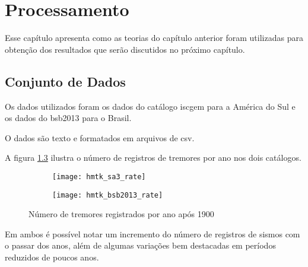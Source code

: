 \chapter{Processamento}
\label{cap:processamento}

Esse capítulo apresenta como as teorias do capítulo anterior foram utilizadas para obtenção 
dos resultados que serão discutidos no próximo capítulo.

\section{Conjunto de Dados}
\label{sec:dados}

Os dados utilizados foram os dados do catálogo \gls{iscgem} \citep{storchak_2013} 
para a América do Sul e 
os dados do \glsdesc{bsb2013} \citep{bsb_2013} para o Brasil.

O dados são texto e formatados em arquivos de \gls{csv}.

A figura \ref{fig:eq_record} ilustra o número de registros de tremores por ano nos dois catálogos.

\begin{figure}[H]
	\centering
	\begin{subfigure}[b]{0.48\textwidth}
		  	\centering
			\texttt{[image: hmtk\_sa3\_rate]}
			\label{fig:sa_eq_record}
	\end{subfigure}%
	\quad %
	\begin{subfigure}[b]{0.48\textwidth}
		  	\centering
			\texttt{[image: hmtk\_bsb2013\_rate]}
			\label{fig:br_eq_record}
    \end{subfigure}%
	\caption{Número de tremores registrados por ano após 1900}
	\label{fig:eq_record}
\end{figure}

Em ambos é possível notar um incremento do número de registros de sismos com o passar dos anos, 
além de algumas variações bem destacadas em períodos reduzidos de poucos anos.



